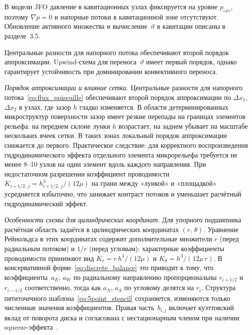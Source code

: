 В модели JFO давление в кавитационных узлах фиксируется на уровне $p_{\mathrm{cav}}$, поэтому $\nabla p = 0$ и напорные потоки в кавитационной зоне отсутствуют. Обновление активного множества и вычисление~$\vartheta$ в кавитации описаны в разделе~3.5.

Центральные разности для напорного потока обеспечивают второй порядок аппроксимации. Upwind-схема для переноса~$\vartheta$ имеет первый порядок, однако гарантирует устойчивость при доминировании конвективного переноса.

\textit{Порядок аппроксимации и влияние сетки.}
Центральные разности для напорного
потока~\eqref{eq:flux_poiseuille} обеспечивают второй порядок
аппроксимации по $\Delta x_1$, $\Delta x_2$ в узлах, где
зазор $h$ гладко изменяется. В области детерминированных
микроструктур поверхности зазор имеет резкие перепады
на границах элементов рельефа: на переднем склоне лунки $h$
возрастает, на заднем убывает на масштабе нескольких ячеек
сетки. В таких зонах локальный порядок аппроксимации снижается
до первого. Практическое следствие: для корректного
воспроизведения гидродинамического эффекта отдельного элемента
микрорельефа требуется не менее 8--10 узлов на один элемент
вдоль каждого направления. При недостаточном разрешении
коэффициент проводимости~$K_{i+1/2,\,j} =
h_{i+1/2,\,j}^3/(12\mu)$ на грани между «лункой»
и «площадкой» усредняется избыточно, что занижает контраст
потоков и уменьшает расчётный гидродинамический эффект.

\textit{Особенности схемы для цилиндрических координат.}
Для упорного подшипника расчётная область задаётся
в цилиндрических координатах $(r,\,\theta)$. Уравнение
Рейнольдса в этих координатах содержит дополнительные
множители $r$ (перед радиальным потоком) и $1/r$ (перед
угловым): характерные коэффициенты проводимости принимают вид
$K_{r} = r\,h^3/(12\mu)$ и $K_\theta = h^3/(12\mu\,r)$.
В консервативной форме~\eqref{eq:discrete_balance} это
приводит к тому, что коэффициенты~$a_E$, $a_W$ по радиальному
направлению пропорциональны $r_{i+1/2}$ и $r_{i-1/2}$
соответственно, тогда как $a_N$, $a_S$ по угловому делятся
на $r_i$. Структура пятиточечного
шаблона~\eqref{eq:5point_stencil} сохраняется, изменяются
только численные значения коэффициентов.
Правая часть~$b_{i,j}$ включает куэттовский вклад от поворота
диска и согласована с нестационарным членом при наличии
squeeze-эффекта~\cite{han2016,panday2012}.
